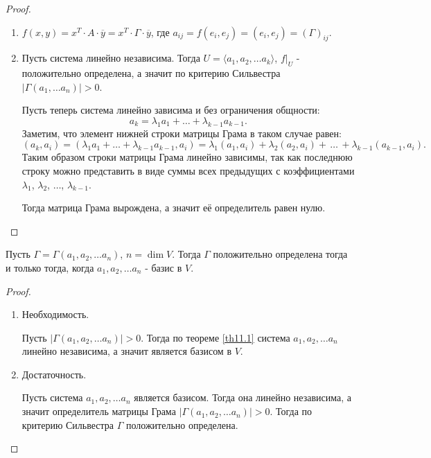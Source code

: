 \begin{proof}~
    \begin{enumerate}
        \item $f(x, y) = x^T \cdot A \cdot \overline{y} =  x^T \cdot \Gamma \cdot \overline{y}$,
        где $a_{ij} = f(e_i, e_j) = (e_i, e_j) = (\Gamma)_{ij}$.
        \item Пусть система линейно независима. Тогда $U = \langle a_1, a_2, \dots a_k \rangle$, 
        $f \vert_{U}$ - положительно определена, а значит по критерию Сильвестра $|\Gamma(a_1, \dots a_n)| > 0$.

        Пусть теперь система линейно зависима и без ограничения общности: 
        $$a_k = \lambda_1 a_1 + \dots + \lambda_{k-1} a_{k-1}.$$
        Заметим, что элемент нижней строки матрицы Грама в таком случае равен: 
        $$(a_k, a_i) = (\lambda_1 a_1 + \dots + \lambda_{k-1} a_{k-1}, a_i) = \lambda_1 (a_1, a_i) + 
        \lambda_2 (a_2, a_i) + \, \dots \, + \lambda_{k-1} (a_{k-1}, a_i).$$
        Таким образом строки матрицы Грама линейно зависимы, так как последнюю строку можно представить 
        в виде суммы всех предыдущих с коэффициентами $\lambda_1$, $\lambda_2$, $\dots$, $\lambda_{k-1}$.

        Тогда матрица Грама вырождена, а значит её определитель равен нулю.
    \end{enumerate}
\end{proof}

\begin{corollary}
    Пусть $\Gamma = \Gamma(a_1, a_2, \dots a_n)$, $n = \dim V$. Тогда $\Gamma$ положительно определена 
    тогда и только тогда, когда $a_1, a_2, \dots a_n$ - базис в $V$.
\end{corollary}

\begin{proof}~
    \begin{enumerate}
        \item Необходимость. 
        
        Пусть $|\Gamma(a_1, a_2, \dots a_n)| > 0$. Тогда по теореме \ref{th11.1} система 
        $a_1, a_2, \dots a_n$ линейно независима, а значит является базисом в $V$.
        \item Достаточность. 
        
        Пусть система $a_1, a_2, \dots a_n$ является базисом. Тогда она 
        линейно независима, а значит определитель матрицы Грама $|\Gamma(a_1, a_2, \dots a_n)| > 0$. Тогда по 
        критерию Сильвестра $\Gamma$ положительно определена.
    \end{enumerate}
\end{proof}

